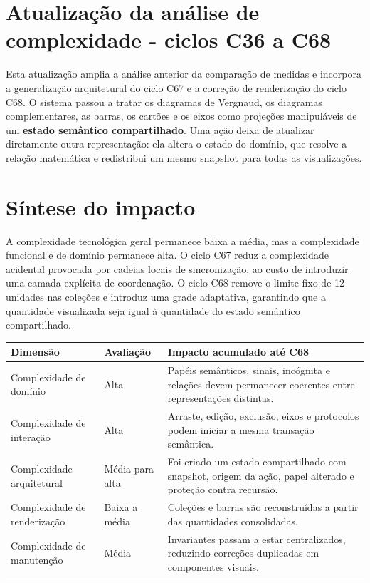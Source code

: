 \documentclass[12pt,a4paper]{article}
\begin{document}
\section*{Atualização da análise de complexidade - ciclos C36 a C68}

Esta atualização amplia a análise anterior da comparação de medidas e incorpora a generalização arquitetural do ciclo C67 e a correção de renderização do ciclo C68. O sistema passou a tratar os diagramas de Vergnaud, os diagramas complementares, as barras, os cartões e os eixos como projeções manipuláveis de um \textbf{estado semântico compartilhado}. Uma ação deixa de atualizar diretamente outra representação: ela altera o estado do domínio, que resolve a relação matemática e redistribui um mesmo snapshot para todas as visualizações.

\section{Síntese do impacto}

A complexidade tecnológica geral permanece baixa a média, mas a complexidade funcional e de domínio permanece alta. O ciclo C67 reduz a complexidade acidental provocada por cadeias locais de sincronização, ao custo de introduzir uma camada explícita de coordenação. O ciclo C68 remove o limite fixo de 12 unidades nas coleções e introduz uma grade adaptativa, garantindo que a quantidade visualizada seja igual à quantidade do estado semântico compartilhado.

\begin{tabularx}{\textwidth}{p{3.8cm}p{2.8cm}X}
\toprule
\textbf{Dimensão} & \textbf{Avaliação} & \textbf{Impacto acumulado até C68}\\
\midrule
Complexidade de domínio & Alta & Papéis semânticos, sinais, incógnita e relações devem permanecer coerentes entre representações distintas.\\
Complexidade de interação & Alta & Arraste, edição, exclusão, eixos e protocolos podem iniciar a mesma transação semântica.\\
Complexidade arquitetural & Média para alta & Foi criado um estado compartilhado com snapshot, origem da ação, papel alterado e proteção contra recursão.\\
Complexidade de renderização & Baixa a média & Coleções e barras são reconstruídas a partir das quantidades consolidadas.\\
Complexidade de manutenção & Média & Invariantes passam a estar centralizados, reduzindo correções duplicadas em componentes visuais.\\
\bottomrule
\end{tabularx}
\end{document}
